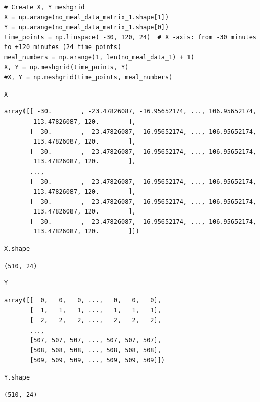 \begin{verbatim}
# Create X, Y meshgrid
X = np.arange(no_meal_data_matrix_1.shape[1])
Y = np.arange(no_meal_data_matrix_1.shape[0])
time_points = np.linspace( -30, 120, 24)  # X -axis: from -30 minutes to +120 minutes (24 time points)
meal_numbers = np.arange(1, len(no_meal_data_1) + 1)
X, Y = np.meshgrid(time_points, Y)
#X, Y = np.meshgrid(time_points, meal_numbers)
\end{verbatim}

\begin{verbatim}
X
\end{verbatim}

\begin{verbatim}
array([[ -30.        , -23.47826087, -16.95652174, ..., 106.95652174,
        113.47826087, 120.        ],
       [ -30.        , -23.47826087, -16.95652174, ..., 106.95652174,
        113.47826087, 120.        ],
       [ -30.        , -23.47826087, -16.95652174, ..., 106.95652174,
        113.47826087, 120.        ],
       ...,
       [ -30.        , -23.47826087, -16.95652174, ..., 106.95652174,
        113.47826087, 120.        ],
       [ -30.        , -23.47826087, -16.95652174, ..., 106.95652174,
        113.47826087, 120.        ],
       [ -30.        , -23.47826087, -16.95652174, ..., 106.95652174,
        113.47826087, 120.        ]])
\end{verbatim}

\begin{verbatim}
X.shape
\end{verbatim}

\begin{verbatim}
(510, 24)
\end{verbatim}

\begin{verbatim}
Y
\end{verbatim}

\begin{verbatim}
array([[  0,   0,   0, ...,   0,   0,   0],
       [  1,   1,   1, ...,   1,   1,   1],
       [  2,   2,   2, ...,   2,   2,   2],
       ...,
       [507, 507, 507, ..., 507, 507, 507],
       [508, 508, 508, ..., 508, 508, 508],
       [509, 509, 509, ..., 509, 509, 509]])
\end{verbatim}

\begin{verbatim}
Y.shape
\end{verbatim}

\begin{verbatim}
(510, 24)
\end{verbatim}

